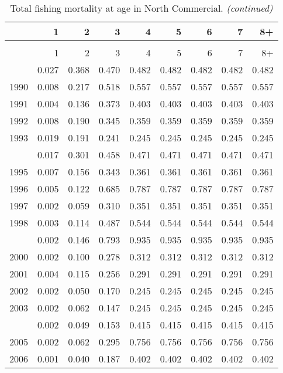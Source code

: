 \documentclass[
]{article}
\begin{document}
\begin{longtable}[t]{lrrrrrrrr}
\caption{\label{tab:North_Commercial-fleet-FAA-table}Total fishing mortality at age in North Commercial.}\\
\toprule
  & 1 & 2 & 3 & 4 & 5 & 6 & 7 & 8+\\
\midrule
\endfirsthead
\caption[]{Total fishing mortality at age in North Commercial. \textit{(continued)}}\\
\toprule
  & 1 & 2 & 3 & 4 & 5 & 6 & 7 & 8+\\
\midrule
\endhead

\endfoot
\bottomrule
\endlastfoot
1989 & 0.027 & 0.368 & 0.470 & 0.482 & 0.482 & 0.482 & 0.482 & 0.482\\
1990 & 0.008 & 0.217 & 0.518 & 0.557 & 0.557 & 0.557 & 0.557 & 0.557\\
1991 & 0.004 & 0.136 & 0.373 & 0.403 & 0.403 & 0.403 & 0.403 & 0.403\\
1992 & 0.008 & 0.190 & 0.345 & 0.359 & 0.359 & 0.359 & 0.359 & 0.359\\
1993 & 0.019 & 0.191 & 0.241 & 0.245 & 0.245 & 0.245 & 0.245 & 0.245\\
\addlinespace
1994 & 0.017 & 0.301 & 0.458 & 0.471 & 0.471 & 0.471 & 0.471 & 0.471\\
1995 & 0.007 & 0.156 & 0.343 & 0.361 & 0.361 & 0.361 & 0.361 & 0.361\\
1996 & 0.005 & 0.122 & 0.685 & 0.787 & 0.787 & 0.787 & 0.787 & 0.787\\
1997 & 0.002 & 0.059 & 0.310 & 0.351 & 0.351 & 0.351 & 0.351 & 0.351\\
1998 & 0.003 & 0.114 & 0.487 & 0.544 & 0.544 & 0.544 & 0.544 & 0.544\\
\addlinespace
1999 & 0.002 & 0.146 & 0.793 & 0.935 & 0.935 & 0.935 & 0.935 & 0.935\\
2000 & 0.002 & 0.100 & 0.278 & 0.312 & 0.312 & 0.312 & 0.312 & 0.312\\
2001 & 0.004 & 0.115 & 0.256 & 0.291 & 0.291 & 0.291 & 0.291 & 0.291\\
2002 & 0.002 & 0.050 & 0.170 & 0.245 & 0.245 & 0.245 & 0.245 & 0.245\\
2003 & 0.002 & 0.062 & 0.147 & 0.245 & 0.245 & 0.245 & 0.245 & 0.245\\
\addlinespace
2004 & 0.002 & 0.049 & 0.153 & 0.415 & 0.415 & 0.415 & 0.415 & 0.415\\
2005 & 0.002 & 0.062 & 0.295 & 0.756 & 0.756 & 0.756 & 0.756 & 0.756\\
2006 & 0.001 & 0.040 & 0.187 & 0.402 & 0.402 & 0.402 & 0.402 & 0.402\\

\end{longtable}
\end{document}
